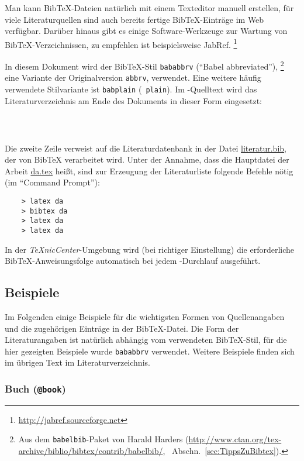 Man kann BibTeX-Dateien natürlich mit einem Texteditor manuell erstellen, für
viele Literaturquellen sind auch bereits fertige BibTeX-Einträge im Web verfügbar.
Darüber hinaus gibt es einige Software-Werkzeuge zur Wartung von
BibTeX-Verzeichnissen, zu empfehlen ist beispielsweise
JabRef.%
\footnote{\url{http://jabref.sourceforge.net}}
 
In diesem Dokument wird der BibTeX-Stil \texttt{bababbrv}
("`Babel abbreviated"'),%
\footnote{Aus dem \texttt{babelbib}-Paket von Harald Harders 
(\url{http://www.ctan.org/tex-archive/biblio/bibtex/contrib/babelbib/},
\sa\ Abschn.\ \ref{sec:TippsZuBibtex}).}
eine Variante der Originalversion \texttt{abbrv}, verwendet. Eine weitere
häufig verwendete Stilvariante ist \texttt{babplain} (\bzw\ \texttt{plain}).
Im \latex-Quelltext wird das Literaturverzeichnis am Ende des
Dokuments in dieser Form eingesetzt:
%
\begin{verbatim}
    
    
\end{verbatim}
%
Die zweite Zeile verweist auf die Literaturdatenbank in der Datei
\url{literatur.bib}, der von BibTeX verarbeitet wird. Unter der Annahme, dass die
Hauptdatei der Arbeit \url{da.tex} heißt, sind zur Erzeugung der Literaturliste
folgende Befehle nötig (im "`Command Prompt"'):
%
\begin{verbatim}
    > latex da
    > bibtex da
    > latex da
    > latex da
\end{verbatim}
%
In der \emph{TeXnicCenter}-Umgebung wird (bei richtiger Einstellung) die
erforderliche BibTeX-Anweisungsfolge automatisch bei jedem \latex-Durchlauf
ausgeführt.




\subsection{Beispiele}
Im Folgenden einige Beispiele für die wichtigsten Formen von Quellenangaben
und die zugehörigen Einträge in der BibTeX-Datei.
Die Form der Literaturangaben ist natürlich abhängig vom verwendeten
BibTeX-Stil, für die hier gezeigten Beispiele wurde \texttt{bababbrv} verwendet.
Weitere Beispiele finden sich im übrigen Text \bzw im
Literaturverzeichnis.


\subsubsection{Buch (\texttt{@book})} 
\nocite{BurgerBurge06}

